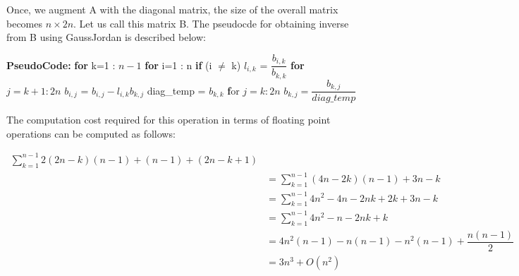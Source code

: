 \documentclass{article}
\newcommand\pseudoCode{\vspace{.10in}\textbf{PseudoCode: }}
\begin{document}
Once, we augment A with  the diagonal matrix, the size of the overall matrix becomes $n \times 2n$. Let us call this matrix B. The pseudocde for obtaining inverse from B using GaussJordan is described below: \newline

\pseudoCode \newline
\hspace*{0.5cm} \textbf {for} k=1 : $n-1$ \newline
\hspace*{1cm}      \textbf {for} i=1 : n \newline
\hspace*{1.5cm}     \textbf {if} (i $\neq$ k) \newline
\hspace*{2cm}            $l_{i,k}$ = $\dfrac{b_{i,k}}{b_{k,k}}$ \newline
\hspace*{2cm}               \textbf {for} $j=k+1 : 2n$ \newline
\hspace*{2.5cm}               $ b_{i,j}$ =  $b_{i,j} - l_{i,k}b_{k,j}$ \newline
\hspace*{1cm}    diag\_temp = $b_{k,k}$ \newline
\hspace*{1cm}    \textbf for $j=k:2n$ \newline
\hspace*{1.5cm}                 $b_{k,j} = \dfrac{b_{k,j}}{diag\_temp}$ \newline

The computation cost required for this operation in terms of floating point operations can be computed as follows: \newline
  
\begin{align*}
  \sum_{k=1}^{n-1} 2(2n-k)(n-1) + (n-1) + (2n - k + 1) \\
 &= \sum_{k=1}^{n-1} (4n - 2k)(n-1) + 3n - k \\
 &= \sum_{k=1}^{n-1} 4n^2 -4n -2nk + 2k + 3n - k \\
 &= \sum_{k=1}^{n-1} 4n^2 -n -2nk + k \\
&= 4n^2(n-1) -n(n-1) -n^2(n-1) +\dfrac{n(n-1)}{2} \\
&= 3n^3 + O(n^2) \\
\end{align*}
\end{document}
